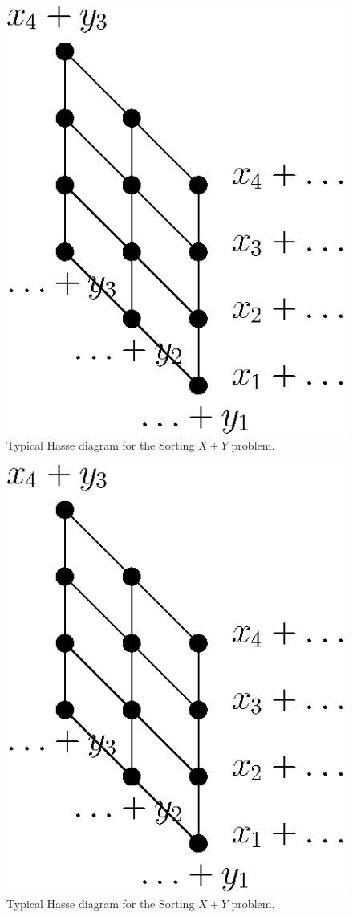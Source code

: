 \begin{figure}
	\centering
	\includegraphics[height=0.2\textheight]{fig/open/x+y}
	\caption{Typical Hasse diagram for the Sorting $X + Y$ problem.}
	\label{fig:xy:poset:incompgraph}
\end{figure}

\begin{figure}
	\centering
	\includegraphics[height=0.2\textheight]{fig/open/x+y}
	\caption{Typical Hasse diagram for the Sorting $X + Y$ problem.}
	\label{fig:xy:poset:mergesort}
\end{figure}

